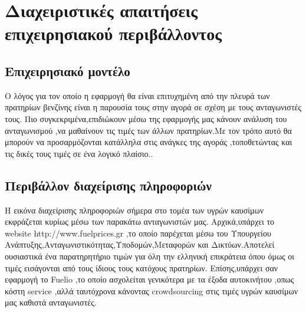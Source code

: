 \section{Διαχειριστικές απαιτήσεις επιχειρησιακού περιβάλλοντος}

\subsection{Επιχειρησιακό μοντέλο}
Ο λόγος για τον οποίο η εφαρμογή θα είναι επιτυχημένη από την πλευρά των πρατηρίων βενζίνης είναι η παρουσία τους στην αγορά σε σχέση με τους ανταγωνιστές τους.
Πιο συγκεκριμένα,επιδιώκουν μέσω της εφαρμογής μας κάνουν ανάλυση του ανταγωνισμού ,να μαθαίνουν τις τιμές των άλλων πρατηρίων.Με τον τρόπο αυτό θα μπορούν να προσαρμόζονται κατάλληλα στις ανάγκες της αγοράς ,τοποθετώντας και τις δικές τους τιμές σε ένα λογικό πλαίσιο.. 


\subsection{Περιβάλλον διαχείρισης πληροφοριών}
Η εικόνα διαχείρισης πληροφοριών σήμερα στο τομέα των υγρών καυσίμων  εκφράζεται κυρίως μέσω των παρακάτω ανταγωνιστών μας.
Αρχικά,υπάρχει το website http://www.fuelprices.gr ,το οποίο παρέχεται μέσω του Υπουργείου Ανάπτυξης,Ανταγωνιστικότητας,Υποδομών,Μεταφορών και Δικτύων.Αποτελεί ουσιαστικά ένα παρατηρητήριο τιμών για όλη την ελληνική επικράτεια όπου όμως οι τιμές εισάγονται από τους ίδιους τους κατόχους πρατηρίων.
Επίσης,υπάρχει σαν εφαρμογή το Fuelio ,το οποίο ασχολείται γενικότερα με τα έξοδα αυτοκινήτου ,οπως κόστη service ,αλλά ταυτόχρονα κάνοντας crowdsourcing στις τιμές υγρών καυσίμων μας καθιστά ανταγωνιστές.
